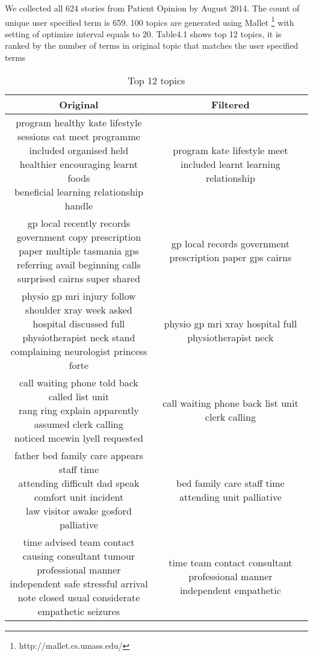 \documentclass[11pt,twoside]{report}
\begin{document}
We collected all 624 stories from Patient Opinion by August 2014. The count of unique user specified term is 659. 100 topics are generated using Mallet \footnote{http://mallet.cs.umass.edu/} with setting of optimize interval equals to 20. Table4.1 shows top 12 topics, it is ranked by the number of terms in original topic that matches the user specified terms
\begin{table}[ht]
\tiny
\caption{Top 12 topics}
\centering
\begin{tabular}{|c|c|}
\hline\hline
Original & Filtered\\
\hline
\makecell{program healthy kate lifestyle sessions eat meet programme\\
	 included organised held healthier encouraging learnt foods\\
	 beneficial learning relationship handle} & {program kate lifestyle meet included learnt learning relationship} \\
\hline

\makecell{gp local recently records government copy prescription\\
	 paper multiple tasmania gps referring avail beginning calls\\
	  surprised cairns super shared } & {gp local records government prescription paper gps cairns}\\
\hline

\makecell{physio gp mri injury follow shoulder xray week asked\\
	 hospital discussed full physiotherapist neck stand \\
	 complaining neurologist princess forte} & {physio gp mri xray hospital full physiotherapist neck}\\
\hline

\makecell{call waiting phone told back called list unit\\
	 rang ring explain apparently assumed clerk calling\\
	 noticed mcewin lyell requested} & {call waiting phone back list unit clerk calling}\\
\hline
  
\makecell{father bed family care appears staff time\\
	 attending difficult dad speak comfort unit incident\\
	 law visitor awake gosford palliative} & {bed family care staff time attending unit palliative}\\
\hline
	
\makecell{time advised team contact causing consultant tumour\\
	 professional manner independent safe stressful arrival\\
	 note closed usual considerate empathetic seizures} & \makecell{time team contact consultant professional manner\\ independent empathetic}\\
\hline


\end{tabular}
\end{table}
\end{document}
